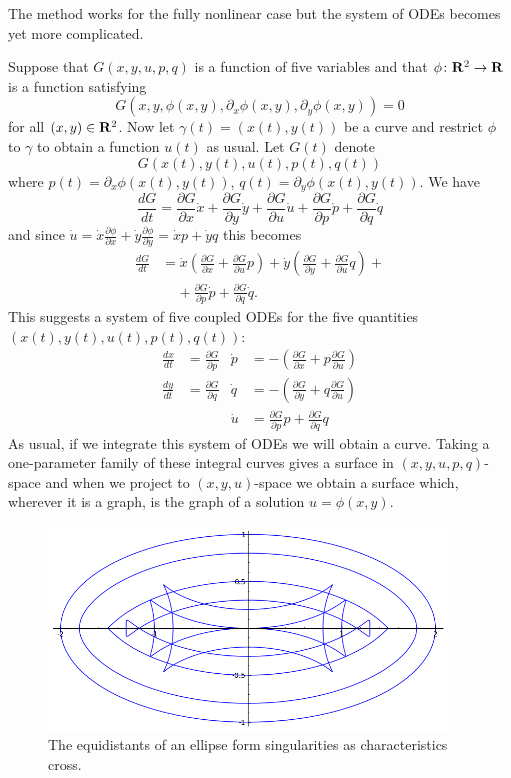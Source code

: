 The method works for the fully nonlinear case but the system of ODEs becomes yet more complicated.

\begin{leftbar}
Suppose that $G(x,y,u,p,q)$ is a function of five variables and that $\phi\colon\mathbf{R}^2\to\mathbf{R}$ is a function satisfying
\[G\left(x,y,\phi(x,y),\partial_x\phi(x,y),\partial_y\phi(x,y)\right)=0\]
for all $(x,y)\in\mathbf{R}^2$. Now let $\gamma(t)=(x(t),y(t))$ be a curve and restrict $\phi$ to $\gamma$ to obtain a function $u(t)$ as usual. Let $G(t)$ denote
\[G(x(t),y(t),u(t),p(t),q(t))\]
where $p(t)=\partial_x\phi(x(t),y(t))$, $q(t)=\partial_y\phi(x(t),y(t))$. We have
\[\frac{dG}{dt}=\frac{\partial G}{\partial x}\dot{x}+\frac{\partial G}{\partial y}\dot{y}+\frac{\partial G}{\partial u}\dot{u}+\frac{\partial G}{\partial p}\dot{p}+\frac{\partial G}{\partial q}\dot{q}\]
and since $\dot{u}=\dot{x}\frac{\partial\phi}{\partial x}+\dot{y}\frac{\partial\phi}{\partial y}=\dot{x}p+\dot{y}q$ this becomes
\begin{align*}
\frac{dG}{dt}&=\dot{x}\left(\frac{\partial G}{\partial x}+\frac{\partial G}{\partial u}p\right)+\dot{y}\left(\frac{\partial G}{\partial y}+\frac{\partial G}{\partial u}q\right)+\\
&\ \ \ \ \ +\frac{\partial G}{\partial p}\dot{p}+\frac{\partial G}{\partial q}\dot{q}.
\end{align*}
This suggests a system of five coupled ODEs for the five quantities $(x(t),y(t),u(t),p(t),q(t))$:
\begin{align*}
\frac{dx}{dt}&=\frac{\partial G}{\partial p}&\dot{p}&=-\left(\frac{\partial G}{\partial x}+p\frac{\partial G}{\partial u}\right)\\
\frac{dy}{dt}&=\frac{\partial G}{\partial q}&\dot{q}&=-\left(\frac{\partial G}{\partial y}+q\frac{\partial G}{\partial u}\right)\\
&&\dot{u}&=\frac{\partial G}{\partial p}p+\frac{\partial G}{\partial q}q
\end{align*}
As usual, if we integrate this system of ODEs we will obtain a curve. Taking a one-parameter family of these integral curves gives a surface in $(x,y,u,p,q)$-space and when we project to $(x,y,u)$-space we obtain a surface which, wherever it is a graph, is the graph of a solution $u=\phi(x,y)$.
\end{leftbar}
\begin{figure}[htb]
\begin{center}
\includegraphics[width=300pt]{equidistants.png}
\end{center}
\caption{The equidistants of an ellipse form singularities as characteristics cross.}
\label{fig-equidistants}
\end{figure}
